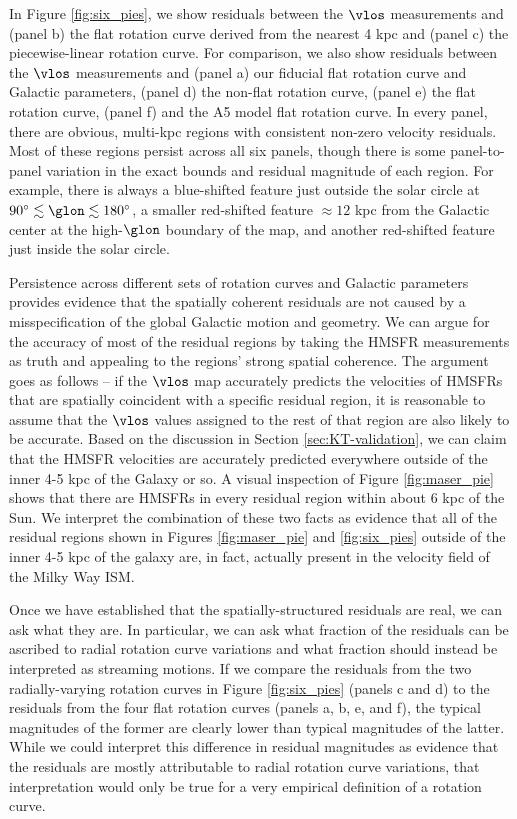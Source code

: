 In Figure \ref{fig:six_pies}, we show residuals between the $\vlos$ measurements and (panel b) the flat rotation curve derived from the nearest 4 kpc and (panel c) the piecewise-linear rotation curve. 
For comparison, we also show residuals between the $\vlos$ measurements and (panel a) our fiducial flat rotation curve and Galactic parameters, (panel d) the \Clemens non-flat rotation curve, (panel e) the \cite{2012ApJ...759..131B} flat rotation curve, (panel f) and the \Reid A5 model flat rotation curve.
In every panel, there are obvious, multi-kpc regions with consistent non-zero velocity residuals.
Most of these regions persist across all six panels, though there is some panel-to-panel variation in the exact bounds and residual magnitude of each region. 
For example, there is always a blue-shifted feature just outside the solar circle at $90^\circ \lesssim \glon \lesssim 180^\circ$, a smaller red-shifted feature $\approx 12$ kpc from the Galactic center at the high-$\glon$ boundary of the map, and another red-shifted feature just inside the solar circle. 

Persistence across different sets of rotation curves and Galactic parameters provides evidence that the spatially coherent residuals are not caused by a misspecification of the global Galactic motion and geometry.
We can argue for the accuracy of most of the residual regions by taking the HMSFR measurements as truth and appealing to the regions' strong spatial coherence.
The argument goes as follows -- if the $\vlos$ map accurately predicts the velocities of HMSFRs that are spatially coincident with a specific residual region, it is reasonable to assume that the $\vlos$ values assigned to the rest of that region are also likely to be accurate. 
Based on the discussion in Section \ref{sec:KT-validation}, we can claim that the HMSFR velocities are accurately predicted everywhere outside of the inner 4-5 kpc of the Galaxy or so.
A visual inspection of Figure \ref{fig:maser_pie} shows that there are HMSFRs in every residual region within about 6 kpc of the Sun. 
We interpret the combination of these two facts as evidence that all of the residual regions shown in Figures \ref{fig:maser_pie} and \ref{fig:six_pies} outside of the inner 4-5 kpc of the galaxy are, in fact, actually present in the velocity field of the Milky Way ISM. 

Once we have established that the spatially-structured residuals are real, we can ask what they are.
In particular, we can ask what fraction of the residuals can be ascribed to radial rotation curve variations and what fraction should instead be interpreted as streaming motions. 
If we compare the residuals from the two radially-varying rotation curves in Figure \ref{fig:six_pies} (panels c and d) to the residuals from the four flat rotation curves (panels a, b, e, and f), the typical magnitudes of the former are clearly lower than typical magnitudes of the latter. 
While we could interpret this difference in residual magnitudes as evidence that the residuals are mostly attributable to radial rotation curve variations, that interpretation would only be true for a very empirical definition of a rotation curve.

